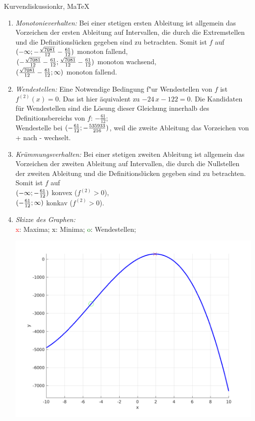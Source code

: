 \begin{MAufgabe}{Kurvendiskussion}{kr, MaTeX}
\begin{enumerate}
 \item \emph{Monotonieverhalten:} 
 Bei einer stetigen ersten Ableitung ist allgemein das Vorzeichen der ersten Ableitung auf Intervallen, die durch die Extremstellen und die Definitionsl\"ucken gegeben sind zu betrachten. Somit ist $f$ auf \\ 
 $(-\infty; - \frac{\sqrt{7081}}{12} - \frac{61}{12})$ monoton fallend, \\ 
 $( - \frac{\sqrt{7081}}{12} - \frac{61}{12};\frac{\sqrt{7081}}{12} - \frac{61}{12})$ monoton  wachsend, \\ 
 $(\frac{\sqrt{7081}}{12} - \frac{61}{12}; \infty)$ monoton fallend. \\ 
 \item \emph{Wendestellen:} 
 Eine Notwendige Bedingung f"ur Wendestellen von $f$ ist $f^{(2)}(x)=0$. 
 Das ist hier \"aquivalent zu $ - 24\, x - 122=0$. 
 Die Kandidaten f\"ur Wendestellen sind die L\"osung dieser Gleichung innerhalb des Definitionsbereichs von $f$: $- \frac{61}{12}$; \\ 
 Wendestelle bei $(- \frac{61}{12};- \frac{535933}{216})$, weil die zweite Ableitung das Vorzeichen von + nach - wechselt. \\ 
 \item \emph{Kr\"ummungsverhalten:} 
 Bei einer stetigen zweiten Ableitung ist allgemein das Vorzeichen der zweiten Ableitung auf Intervallen, die durch die Nullstellen der zweiten Ableitung und die Definitionsl\"ucken gegeben sind zu betrachten. 
 Somit ist $f$ auf \\ 
 $(-\infty ;- \frac{61}{12})$  konvex ($f^{(2)}>0$), \\ 
 $(- \frac{61}{12}; \infty)$  konkav ($f^{(2)}>0$). \\ 
 \item \emph{Skizze des Graphen:} \\ 
 {\textcolor{red} x}: Maxima; {\textcolor{black} x}: Minima; {\textcolor{green} o}: Wendestellen; 
  \begin{center}
  \includegraphics[width=0.8\linewidth]{Abb_zur_Ag_autogenerated_fractions_35.png} \end{center}
  
 \end{enumerate}
 \else\relax\fi
  \end{MAufgabe}